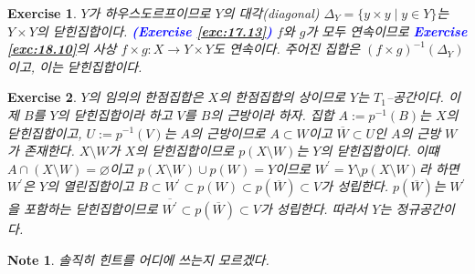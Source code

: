 \documentclass{article}
\newtheorem{exercise}{Exercise}[section]
\newtheorem*{note}{Note}
\begin{document}
\begin{exercise}
    $Y$가 하우스도르프이므로 $Y$의 대각(diagonal) $\Delta_Y=\{y\times y\mid y\in Y\}$는 $Y\times Y$의 닫힌집합이다. \textcolor{blue}{\textbf{(Exercise \ref{exc:17.13})}} $f$와 $g$가 모두 연속이므로 \textcolor{blue}{\textbf{Exercise \ref{exc:18.10}}}의 사상 $f\times g:X\to Y\times Y$도 연속이다. 주어진 집합은 $(f\times g)^{-1}(\Delta_Y)$이고, 이는 닫힌집합이다.
\end{exercise}

\begin{exercise}          
    $Y$의 임의의 한점집합은 $X$의 한점집합의 상이므로 $Y$는 $T_1$--공간이다. 이제 $B$를 $Y$의 닫힌집합이라 하고 $V$를 $B$의 근방이라 하자. 집합 $A:=p^{-1}(B)$는 $X$의 닫힌집합이고, $U:=p^{-1}(V)$는 $A$의 근방이므로 $A\subset W$이고 $\overline{W}\subset U$인 $A$의 근방 $W$가 존재한다. $X\setminus W$가 $X$의 닫힌집합이므로 $p(X\setminus W)$는 $Y$의 닫힌집합이다. 이떄 $A\cap(X\setminus W)=\varnothing$이고 $p(X\setminus W)\cup p(W)=Y$이므로 $W^\prime=Y\setminus p(X\setminus W)$라 하면 $W^\prime$은 $Y$의 열린집합이고 $B\subset W^\prime\subset p(W)\subset p(\overline{W})\subset V$가 성립한다. $p(\overline{W})$는 $W^\prime$을 포함하는 닫힌집합이므로 $\overline{W^\prime}\subset p(\overline{W})\subset V$가 성립한다. 따라서 $Y$는 정규공간이다.
\end{exercise}
\begin{note}
    솔직히 힌트를 어디에 쓰는지 모르겠다.
\end{note}
\end{document}
